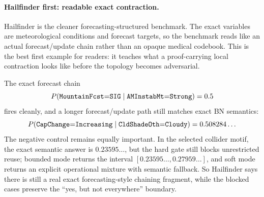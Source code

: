 \documentclass[11pt,openany]{report}
\begin{document}
\paragraph{Hailfinder first: readable exact contraction.}
Hailfinder is the cleaner forecasting-structured benchmark.  The exact
variables are meteorological conditions and forecast targets, so the
benchmark reads like an actual forecast/update chain rather than an
opaque medical codebook.  This is the best first example for readers:
it teaches what a proof-carrying local contraction looks like before the
topology becomes adversarial.
\par
The exact forecast chain
\[
  P(\texttt{MountainFcst}{=}\texttt{SIG} \mid
    \texttt{AMInstabMt}{=}\texttt{Strong}) = 0.5
\]
fires cleanly, and a longer forecast/update path still matches exact BN
semantics:
\[
  P(\texttt{CapChange}{=}\texttt{Increasing} \mid
    \texttt{CldShadeOth}{=}\texttt{Cloudy}) = 0.508284\ldots
\]
The negative control remains equally important.  In the selected
collider motif, the exact semantic answer is $0.23595\ldots$, but the
hard gate still blocks unrestricted reuse; bounded mode returns the
interval $[0.23595\ldots, 0.27959\ldots]$, and soft mode returns an
explicit operational mixture with semantic fallback.  So Hailfinder says
there is still a real exact forecasting-style chaining fragment, while
the blocked cases preserve the ``yes, but not everywhere'' boundary.
\end{document}
